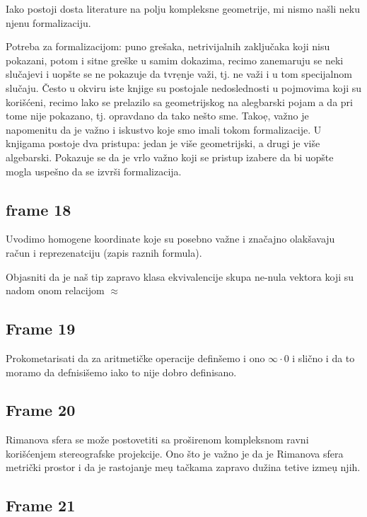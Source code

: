 \documentclass{article}
\begin{document}
Iako postoji dosta literature na polju kompleksne geometrije, mi nismo na\v sli 
neku njenu formalizaciju.

Potreba za formalizacijom: puno gre\v saka, netrivijalnih zaklju\v caka koji  
nisu pokazani, potom i sitne gre\v ske u samim dokazima, recimo zanemaruju se 
neki slu\v cajevi i uop\v ste se ne pokazuje da tvr\d enje va\v zi, tj. ne va\v 
zi i u tom specijalnom slu\v caju. \v Cesto u okviru iste knjige su postojale 
nedoslednosti u pojmovima koji su kori\v s\'ceni, recimo lako se prelazilo sa 
geometrijskog na alegbarski pojam a da pri tome nije pokazano, tj. opravdano da 
tako ne\v sto sme. 
Tako\d e, va\v zno je napomenitu da je va\v zno i iskustvo koje smo imali tokom 
formalizacije. U knjigama postoje dva pristupa: jedan je vi\v se geometrijski, 
a drugi je vi\v se algebarski. Pokazuje se da je vrlo va\v zno koji se pristup 
izabere da bi uop\v ste mogla uspe\v sno da se izvr\v si formalizacija.

\subsection{frame 18}

Uvodimo homogene koordinate koje su posebno va\v zne i zna\v cajno olak\v 
savaju ra\v cun i reprezenatciju (zapis raznih formula).

Objasniti da je na\v s tip zapravo klasa ekvivalencije skupa ne-nula vektora 
koji su nadom onom relacijom $\approx$

\subsection{Frame 19}

Prokometarisati da za aritmeti\v cke operacije defin\v semo i ono $\infty \cdot 
0$ i sli\v cno i da to moramo da defnisi\v semo iako to nije dobro definisano.

\subsection{Frame 20}

Rimanova sfera se mo\v ze postovetiti sa pro\v sirenom kompleksnom ravni kori\v 
s\'cenjem stereografske projekcije. Ono \v sto je va\v zno je da je Rimanova 
sfera metri\v cki prostor i da je rastojanje me\d u ta\v ckama zapravo du\v 
zina tetive izme\d u njih.

\subsection{Frame 21}
\end{document}
